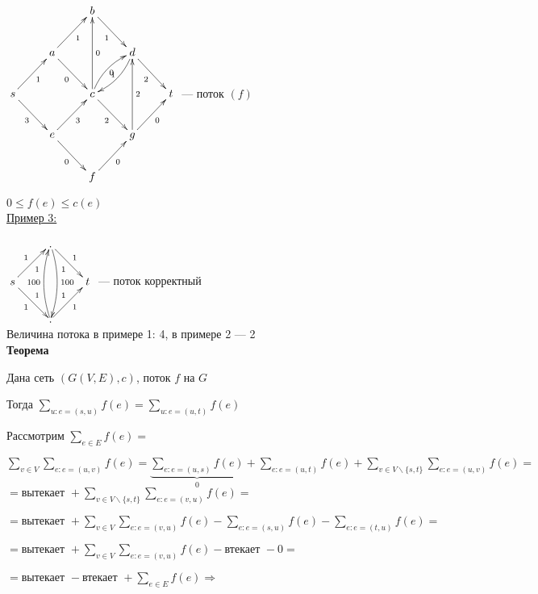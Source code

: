 \documentclass[a4paper, 12pt] {article}
\begin{document}
$\begin{matrix}
	\xymatrix{
		& & b \ar@{->}[rd]_1 \\
		& a \ar@{->}[rd]_0 \ar@{->}[ru]_1 & & d \ar@{->}[rd]_2 \ar@/^/[dl]_0 \\
		s \ar@{->}[rd]_3 \ar@{->}[ru]_1 & & c \ar@{->}[uu]_0 \ar@{->}[rd]_2 \ar@/^/[ru]_1  & & t \\
		& e \ar@{->}[rd]_0 \ar@{->}[ru]_3 & & g \ar@{->}[ru]_0 \ar@{->}[uu]_2 \\
		& & f \ar@{->}[ru]_0
	}
\end{matrix}$ --- поток $ (f) $

$ 0 \le f(e) \le c(e) $ \\

\underline{Пример 3:}

$\begin{matrix}
	\xymatrix{
		& . \ar@{->}[rd]_1^1 \ar@/^/[dd]^{100} \\
		s \ar@{->}[rd]_1^1 \ar@{->}[ru]_1^1 &  & t \\
		& . \ar@{->}[ru]_1^1 \ar@/^/[uu]^{100} \\
	}
\end{matrix}$ --- поток корректный\\

Величина потока в примере 1: 4, в примере 2 --- 2\\

\textbf{Теорема} 

Дана сеть $ (G(V, E), c) $, поток $ f $ на $ G $

Тогда
$ \sum\limits_{u: e = (s, u)} f(e) = \sum\limits_{u: e = (u, t)} f(e) $

Рассмотрим $ \sum\limits_{e \in E} f(e) =$

$ \sum\limits_{v \in V} \sum\limits_{e: e = (u, v)} f(e) = \underbrace{\sum\limits_{e: e = (u, s)} f(e)}_0 + \sum\limits_{e: e = (u, t)} f(e) + \sum\limits_{v \in V \backslash \{s, t\}} \sum\limits_{e: e = (u, v)} f(e) =$\\

$ = \text{вытекает } + \sum\limits_{v \in V \backslash \{s, t\}} \sum\limits_{e: e = (v, u)} f(e) = $

$ = \text{вытекает } + \sum\limits_{v \in V} \sum\limits_{e: e = (v, u)} f(e) - \sum\limits_{e: e = (s, u)} f(e) - \sum\limits_{e: e = (t, u)} f(e) =$

$ = \text{вытекает } + \sum\limits_{v \in V} \sum\limits_{e: e = (v, u)} f(e) - \text{втекает } -0  =$

$ = \text{вытекает } - \text{втекает } + \sum\limits_{e \in E} f(e) \Rightarrow $
\end{document}
